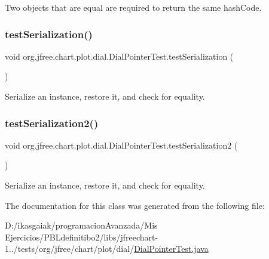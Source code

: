 Two objects that are equal are required to return the same hash\+Code. \mbox{\label{classorg_1_1jfree_1_1chart_1_1plot_1_1dial_1_1_dial_pointer_test_a0b46592c56fb8d7e1bd57ab3d03a21bf}} 
\subsubsection{\texorpdfstring{test\+Serialization()}{testSerialization()}}
{\footnotesize\ttfamily void org.\+jfree.\+chart.\+plot.\+dial.\+Dial\+Pointer\+Test.\+test\+Serialization (\begin{DoxyParamCaption}{ }\end{DoxyParamCaption})}

Serialize an instance, restore it, and check for equality. \mbox{\label{classorg_1_1jfree_1_1chart_1_1plot_1_1dial_1_1_dial_pointer_test_a4e890f1a227ad978a6082f447dcfbf67}} 
\subsubsection{\texorpdfstring{test\+Serialization2()}{testSerialization2()}}
{\footnotesize\ttfamily void org.\+jfree.\+chart.\+plot.\+dial.\+Dial\+Pointer\+Test.\+test\+Serialization2 (\begin{DoxyParamCaption}{ }\end{DoxyParamCaption})}

Serialize an instance, restore it, and check for equality. 

The documentation for this class was generated from the following file\+:\begin{DoxyCompactItemize}
\item 
D\+:/ikasgaiak/programacion\+Avanzada/\+Mis Ejercicios/\+P\+B\+Ldefinitibo2/libs/jfreechart-\/1../tests/org/jfree/chart/plot/dial/\mbox{\hyperlink{_dial_pointer_test_8java}{Dial\+Pointer\+Test.\+java}}\end{DoxyCompactItemize}
